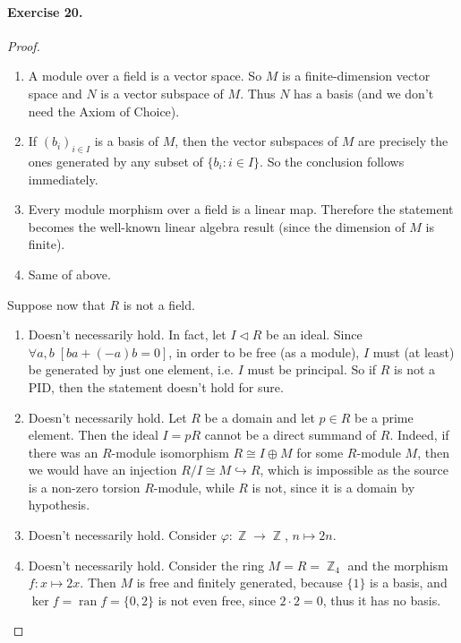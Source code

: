 \documentclass[12pt,a4paper]{report}
\theoremstyle{definition}
\theoremstyle{num.custom-title}
\DeclareMathOperator{\ran}{ran}
\DeclareMathOperator{\Z}{\mathbb{Z}}
\renewcommand{\phi}{\varphi}
\begin{document}
\paragraph{Exercise 20.} 
\begin{proof}\ 
\begin{enumerate}
\item A module over a field is a vector space. So $M$ is a finite-dimension vector space and $N$ is a vector subspace of $M$. Thus $N$ has a basis (and we don't need the Axiom of Choice).
\item If $(b_i)_{i \in I}$ is a basis of $M$, then the vector subspaces of $M$ are precisely the ones generated by any subset of $\{b_i : i \in I\}$. So the conclusion follows immediately.
\item Every module morphism over a field is a linear map. Therefore the statement becomes the well-known linear algebra result (since the dimension of $M$ is finite).
\item Same of above.
\end{enumerate}
Suppose now that $R$ is not a field.
\begin{enumerate}
\item Doesn't necessarily hold. In fact, let $I \lhd R$ be an ideal. Since $\forall a,b \; [b a  + (-a) b =0]$, in order to be free (as a module), $I$ must (at least) be generated by just one element, i.e. $I$ must be principal. So if $R$ is not a PID, then the statement doesn't hold for sure.
\item Doesn't necessarily hold. Let $R$ be a domain and let $p\in R$ be a prime element. Then the ideal $I=pR$ cannot be a direct summand of $R$. Indeed, if there was an $R$-module isomorphism $R\cong I\oplus M$ for some $R$-module $M$, then we would have an injection $R/I\cong M\hookrightarrow R$, which is impossible as the source is a non-zero torsion $R$-module, while $R$ is not, since it is a domain by hypothesis.
\item Doesn't necessarily hold. Consider $\phi: \Z \to \Z$, $n \mapsto 2n$.
\item Doesn't necessarily hold. Consider the ring $M=R=\Z_4$ and the morphism $f: x \mapsto 2x$. Then $M$ is free and finitely generated, because $\{1\}$ is a basis, and $\ker f =\ran f = \{0,2\}$ is not even free, since $2 \cdot 2 = 0$, thus it has no basis.
\end{enumerate}
\end{proof}
\end{document}
